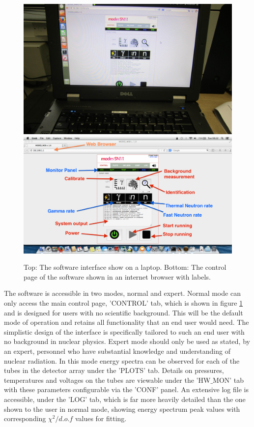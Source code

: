 \begin{figure}
\begin{center}
\includegraphics[width=155mm]{./Chapter7/figures/laptop.jpg} \\
\includegraphics[width=155mm]{./Chapter7/figures/softwareInterfaceMainPage.png}
\end{center}
\caption{Top: The software interface show on a laptop. Bottom: The control page of the software shown in an internet browser with labels.}
\label{fig:modesSoftwareInterface}
\end{figure}

The software is accessible in two modes, normal and expert. Normal mode can only access the main control page, 'CONTROL' tab, which is shown in figure \ref{fig:modesSoftwareInterface} and is designed for users with no scientific background. This will be the default mode of operation and retains all functionality that an end user would need. The simplistic design of the interface is specifically tailored to such an end user with no background in nuclear physics. Expert mode should only be used as stated, by an expert, personnel who have substantial knowledge and understanding of nuclear radiation. In this mode energy spectra can be observed for each of the tubes in the detector array under the 'PLOTS' tab. Details on pressures, temperatures and voltages on the tubes are viewable under the 'HW$\_$MON' tab with these parameters configurable via the 'CONF' panel. An extensive log file is accessible, under the 'LOG' tab, which is far more heavily detailed than the one shown to the user in normal mode, showing energy spectrum peak values with corresponding $\chi^{2}/d.o.f$ values for fitting.

